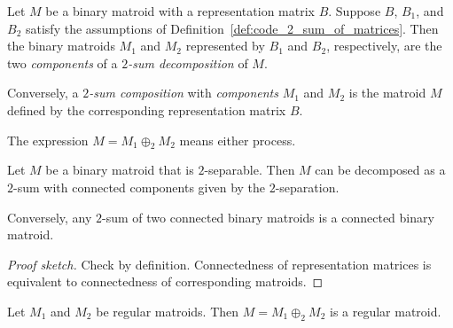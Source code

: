 \begin{definition}
  \label{def:code_2_sum_of_binary}
  Let $M$ be a binary matroid with a representation matrix $B$.
  Suppose $B$, $B_{1}$, and $B_{2}$ satisfy the assumptions of Definition~\ref{def:code_2_sum_of_matrices}.
  Then the binary matroids $M_{1}$ and $M_{2}$ represented by $B_{1}$ and $B_{2}$, respectively, are the two \emph{components} of a \emph{$2$-sum decomposition} of $M$.

  Conversely, a \emph{$2$-sum composition} with \emph{components} $M_{1}$ and $M_{2}$ is the matroid $M$ defined by the corresponding representation matrix $B$.

  The expression $M = M_{1} \oplus_{2} M_{2}$ means either process.
\end{definition}

\begin{lemma}
  \label{lem:code_2_sep_2_sum}
  Let $M$ be a binary matroid that is $2$-separable.
  Then $M$ can be decomposed as a $2$-sum with connected components given by the $2$-separation.

  Conversely, any $2$-sum of two connected binary matroids is a connected binary matroid.
\end{lemma}

\begin{proof}[Proof sketch]
  Check by definition. Connectedness of representation matrices is equivalent to connectedness of corresponding matroids.
\end{proof}

\begin{lemma}
  \label{lem:code_2_sum_of_regular}
  Let $M_{1}$ and $M_{2}$ be regular matroids. Then $M = M_{1} \oplus_{2} M_{2}$ is a regular matroid.
\end{lemma}

